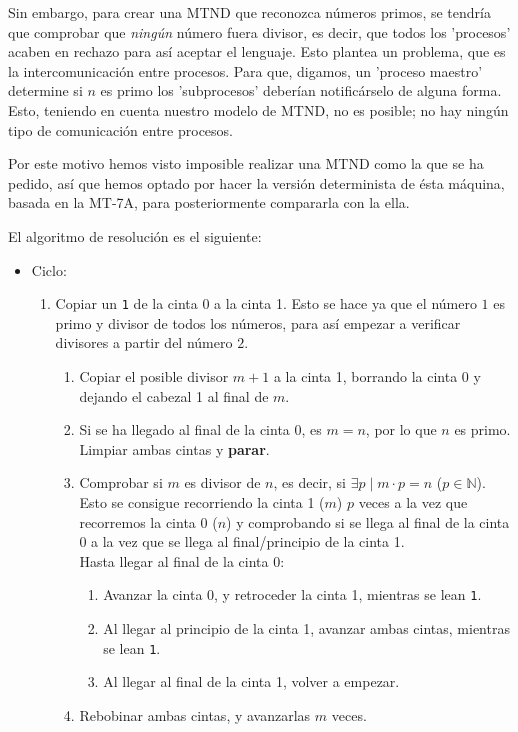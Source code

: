 Sin embargo, para crear una MTND que reconozca números primos, se tendría que comprobar que \textit{ningún} número fuera divisor, es decir, que todos los 'procesos' acaben en rechazo para así aceptar el lenguaje. Esto plantea un problema, que es la intercomunicación entre procesos. Para que, digamos, un 'proceso maestro' determine si $n$ es primo los 'subprocesos' deberían notificárselo de alguna forma.\\
Esto, teniendo en cuenta nuestro modelo de MTND, no es posible; no hay ningún tipo de comunicación entre procesos.\medskip

Por este motivo hemos visto imposible realizar una MTND como la que se ha pedido, así que hemos optado por hacer la versión determinista de ésta máquina, basada en la MT-7A, para posteriormente compararla con la ella.\bigskip

El algoritmo de resolución es el siguiente:
\begin{itemize}
    \item Ciclo:
    \begin{enumerate}
        \item Copiar un \texttt{1} de la cinta 0 a la cinta 1. Esto se hace ya que el número $1$ es primo y divisor de todos los números, para así empezar a verificar divisores a partir del número $2$.
        \begin{enumerate}
            \item Copiar el posible divisor $m+1$ a la cinta 1, borrando la cinta 0 y dejando el cabezal 1 al final de $m$.
            \item Si se ha llegado al final de la cinta 0, es $m=n$, por lo que $n$ es primo. Limpiar ambas cintas y \textbf{parar}.
            \item Comprobar si $m$ es divisor de $n$, es decir, si $\exists p \mid m\cdot p = n$ ($p \in \mathbb{N}$). Esto se consigue recorriendo la cinta 1 ($m$) $p$ veces a la vez que recorremos la cinta 0 ($n$) y comprobando si se llega al final de la cinta 0 a la vez que se llega al final/principio de la cinta 1.\\
            Hasta llegar al final de la cinta 0:
            \begin{enumerate}[1.]
                \item Avanzar la cinta 0, y retroceder la cinta 1, mientras se lean \texttt{1}.
                \item Al llegar al principio de la cinta 1, avanzar ambas cintas, mientras se lean \texttt{1}.
                \item Al llegar al final de la cinta 1, volver a empezar.
            \end{enumerate}
            \item Rebobinar ambas cintas, y avanzarlas $m$ veces.
        \end{enumerate}
    \end{enumerate}
\end{itemize}

